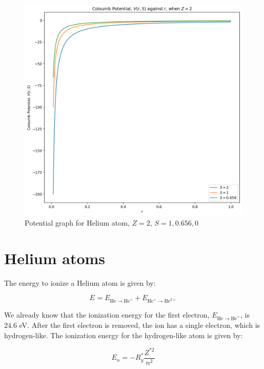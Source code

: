 \documentclass[11pt]{article}
\begin{document}
    \begin{figure}[H]
      \centering
      \includegraphics[width=1\textwidth]{../image/Coloumb_Potential_Assignment_6.png}
      \caption{Potential graph for Helium atom, $Z = 2$, $S = 1, 0.656, 0$}
    \end{figure}

    \section{Helium atoms}

    The energy to ionize a Helium atom is given by:

    \begin{equation}
      E_{} = E_{\text{He} \rightarrow \text{He}^{+}} + E_{\text{He}^{+} \rightarrow \text{He}^{2+}}
    \end{equation}

    We already know that the ionization energy for the first electron, $E_{\text{He} \rightarrow \text{He}^{+}}$, is $24.6$ eV. After
    the first electron is removed, the  ion has a single electron, which is hydrogen-like. The ionization
    energy for the hydrogen-like atom is given by:

    \begin{equation}
      E_n = - R_y^* \frac{Z^{*2}}{n^{2}}
    \end{equation}
\end{document}
